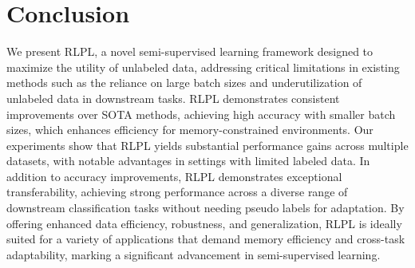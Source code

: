 \section{Conclusion}


We present RLPL, a novel semi-supervised learning framework designed to maximize the utility of unlabeled data, addressing critical limitations in existing methods such as the reliance on large batch sizes and underutilization of unlabeled data in downstream tasks. RLPL demonstrates consistent improvements over SOTA methods, achieving high accuracy with smaller batch sizes, which enhances efficiency for memory-constrained environments. Our experiments show that RLPL yields substantial performance gains across multiple datasets, with notable advantages in settings with limited labeled data. In addition to accuracy improvements, RLPL demonstrates exceptional transferability, achieving strong performance across a diverse range of downstream classification tasks without needing pseudo labels for adaptation. By offering enhanced data efficiency, robustness, and generalization, RLPL is ideally suited for a variety of applications that demand memory efficiency and cross-task adaptability, marking a significant advancement in semi-supervised learning.